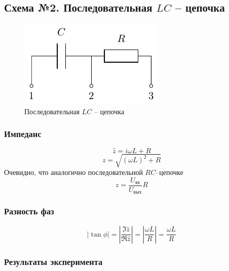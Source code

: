 \subsection{Схема №2. Последовательная $LC$ -- цепочка}
\vspace{-1em}
\begin{figure}[H]
	\centering
	\includegraphics[]{chems/chem1}
	\caption{Последовательная $LC$ -- цепочка}
	\label{fig:LC}
\end{figure}
\vspace{-1em}
\subsubsection{Импеданс}
\vspace{-2em}
\begin{equation}
	\hat{z}=i\omega L+R
\end{equation}
\begin{equation}
	z=\sqrt{(\omega L)^2+R}
\end{equation}
Очевидно, что аналогично последовательной $RC$--цепочке
\begin{equation}
	z=\frac{U_\text{вх}}{U_\text{вых}}R
\end{equation}
\vspace{-1em}
\subsubsection{Разность фаз}
\vspace{-2em}
\begin{equation}
	\left|\tan\phi\right| = \left|\frac{\Im\hat{z}}{\Re\hat{z}}\right|=
	\left|\frac{
		\omega L
	}{
		R
	}\right|=
	\frac{
		\omega L
	}{
		R
	}
\end{equation}

\subsubsection{Результаты эксперимента}

